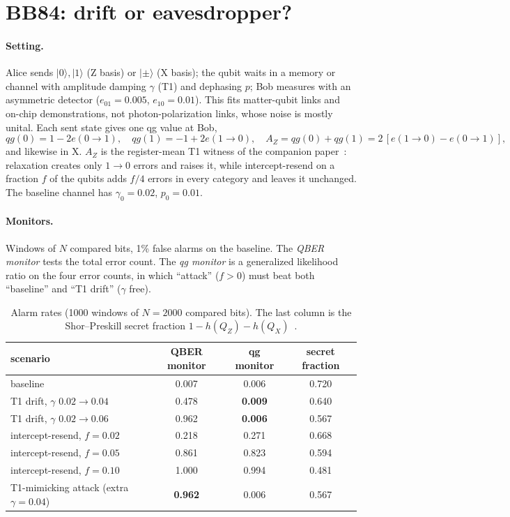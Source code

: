 \documentclass[11pt]{article}
\begin{document}
\section{BB84: drift or eavesdropper?}\label{sec:bb84}

\paragraph{Setting.} Alice sends $|0\rangle,|1\rangle$ (Z basis) or $|\pm\rangle$ (X basis); the
qubit waits in a memory or channel with amplitude damping $\gamma$ (T1) and dephasing $p$; Bob
measures with an asymmetric detector ($e_{01}=0.005$, $e_{10}=0.01$). This fits matter-qubit links
and on-chip demonstrations, not photon-polarization links, whose noise is mostly unital. Each sent
state gives one qg value at Bob,
\begin{equation}
qg(0)=1-2e(0\!\to\!1),\quad qg(1)=-1+2e(1\!\to\!0),\quad
A_Z=qg(0)+qg(1)=2\,[e(1\!\to\!0)-e(0\!\to\!1)],
\end{equation}
and likewise in X. $A_Z$ is the register-mean T1 witness of the companion paper~\cite{monteverde2026witness}:
relaxation creates only $1\to0$ errors and raises it, while intercept-resend on a fraction $f$ of the
qubits adds $f/4$ errors in every category and leaves it unchanged. The baseline channel has
$\gamma_0=0.02$, $p_0=0.01$.

\paragraph{Monitors.} Windows of $N$ compared bits, 1\% false alarms on the baseline. The
\emph{QBER monitor} tests the total error count. The \emph{qg monitor} is a generalized likelihood
ratio on the four error counts, in which ``attack'' ($f>0$) must beat both ``baseline'' and ``T1
drift'' ($\gamma$ free).

\begin{table}[t]
\centering\small
\caption{Alarm rates (1000 windows of $N=2000$ compared bits). The last column is the Shor--Preskill
secret fraction $1-h(Q_Z)-h(Q_X)$~\cite{shorpreskill2000}.}
\label{tab:bb84}
\begin{tabular}{lccc}
\toprule
scenario & QBER monitor & qg monitor & secret fraction\\
\midrule
baseline & 0.007 & 0.006 & 0.720\\
T1 drift, $\gamma$ $0.02\to0.04$ & 0.478 & \textbf{0.009} & 0.640\\
T1 drift, $\gamma$ $0.02\to0.06$ & 0.962 & \textbf{0.006} & 0.567\\
intercept-resend, $f=0.02$ & 0.218 & 0.271 & 0.668\\
intercept-resend, $f=0.05$ & 0.861 & 0.823 & 0.594\\
intercept-resend, $f=0.10$ & 1.000 & 0.994 & 0.481\\
T1-mimicking attack (extra $\gamma=0.04$) & \textbf{0.962} & 0.006 & 0.567\\
\bottomrule
\end{tabular}
\end{table}
\end{document}
